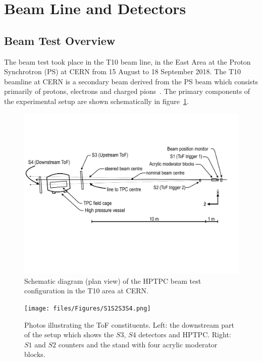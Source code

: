 \section{Beam Line and Detectors}
\label{hptpcPaper:sec:Methods}

\subsection{Beam Test Overview}
The beam test took place in the T10 beam line, in the East Area at the Proton Synchrotron (PS) at CERN from 15 August to 18 September 2018.
The T10 beamline at CERN is a secondary beam derived from the PS beam which consists primarily of protons, electrons and charged pions~\cite{T10Report}.
The primary components of the experimental setup are shown schematically in figure~\ref{fig:setup}.

\begin{figure}
  \includegraphics[width=1.0\linewidth]{files/Figures/hptpc_t10_planview.pdf}
  \caption{Schematic diagram (plan view) of the HPTPC beam test configuration in the T10 area at CERN.}
  \label{fig:setup}
\end{figure}
\begin{figure}
  \centering
  \texttt{[image: files/Figures/S1S2S3S4.png]}
  \caption{Photos illustrating the ToF constituents. Left: the downstream part of the setup which shows the $\mathit{S3}$, $\mathit{S4}$ detectors and HPTPC. Right: $\mathit{S1}$ and $\mathit{S2}$ counters and the stand with four acrylic moderator blocks.}
  \label{fig:modblocks}
\end{figure}

